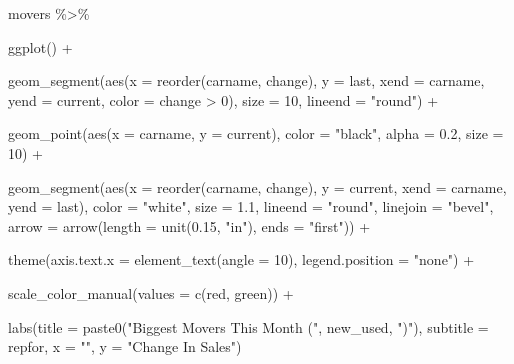 \documentclass[
]{article}
\newenvironment{Shaded}{\begin{snugshade}}{\end{snugshade}}
\newcommand{\AttributeTok}[1]{\textcolor[rgb]{0.77,0.63,0.00}{#1}}
\newcommand{\DecValTok}[1]{\textcolor[rgb]{0.00,0.00,0.81}{#1}}
\newcommand{\FloatTok}[1]{\textcolor[rgb]{0.00,0.00,0.81}{#1}}
\newcommand{\FunctionTok}[1]{\textcolor[rgb]{0.00,0.00,0.00}{#1}}
\newcommand{\NormalTok}[1]{#1}
\newcommand{\SpecialCharTok}[1]{\textcolor[rgb]{0.00,0.00,0.00}{#1}}
\newcommand{\StringTok}[1]{\textcolor[rgb]{0.31,0.60,0.02}{#1}}
\begin{document}
\begin{Shaded}
\begin{Highlighting}[]
\NormalTok{movers }\SpecialCharTok{\%\textgreater{}\%}
  
  \FunctionTok{ggplot}\NormalTok{() }\SpecialCharTok{+} 
  
  \FunctionTok{geom\_segment}\NormalTok{(}\FunctionTok{aes}\NormalTok{(}\AttributeTok{x =} \FunctionTok{reorder}\NormalTok{(carname, change), }\AttributeTok{y =}\NormalTok{ last, }\AttributeTok{xend =}\NormalTok{ carname, }\AttributeTok{yend =}\NormalTok{ current, }\AttributeTok{color =}\NormalTok{ change }\SpecialCharTok{\textgreater{}} \DecValTok{0}\NormalTok{),}
               \AttributeTok{size =} \DecValTok{10}\NormalTok{, }\AttributeTok{lineend =} \StringTok{"round"}\NormalTok{) }\SpecialCharTok{+}
  
  \FunctionTok{geom\_point}\NormalTok{(}\FunctionTok{aes}\NormalTok{(}\AttributeTok{x =}\NormalTok{ carname, }\AttributeTok{y =}\NormalTok{ current), }\AttributeTok{color =} \StringTok{"black"}\NormalTok{, }\AttributeTok{alpha =} \FloatTok{0.2}\NormalTok{, }\AttributeTok{size  =} \DecValTok{10}\NormalTok{) }\SpecialCharTok{+}

  
  \FunctionTok{geom\_segment}\NormalTok{(}\FunctionTok{aes}\NormalTok{(}\AttributeTok{x =} \FunctionTok{reorder}\NormalTok{(carname, change), }\AttributeTok{y =}\NormalTok{ current, }\AttributeTok{xend =}\NormalTok{ carname, }\AttributeTok{yend =}\NormalTok{ last),}
               \AttributeTok{color =} \StringTok{"white"}\NormalTok{,}
               \AttributeTok{size =} \FloatTok{1.1}\NormalTok{, }\AttributeTok{lineend =} \StringTok{"round"}\NormalTok{, }\AttributeTok{linejoin =} \StringTok{"bevel"}\NormalTok{,}
               \AttributeTok{arrow =} \FunctionTok{arrow}\NormalTok{(}\AttributeTok{length =} \FunctionTok{unit}\NormalTok{(}\FloatTok{0.15}\NormalTok{, }\StringTok{"in"}\NormalTok{), }\AttributeTok{ends =} \StringTok{"first"}\NormalTok{)) }\SpecialCharTok{+}
  
  \FunctionTok{theme}\NormalTok{(}\AttributeTok{axis.text.x =} \FunctionTok{element\_text}\NormalTok{(}\AttributeTok{angle =} \DecValTok{10}\NormalTok{),}
        \AttributeTok{legend.position =} \StringTok{"none"}\NormalTok{) }\SpecialCharTok{+}
  
  \FunctionTok{scale\_color\_manual}\NormalTok{(}\AttributeTok{values =} \FunctionTok{c}\NormalTok{(red, green)) }\SpecialCharTok{+}
  
  \FunctionTok{labs}\NormalTok{(}\AttributeTok{title =} \FunctionTok{paste0}\NormalTok{(}\StringTok{"Biggest Movers This Month ("}\NormalTok{, new\_used, }\StringTok{")"}\NormalTok{),}
       \AttributeTok{subtitle =}\NormalTok{ repfor,}
       \AttributeTok{x =} \StringTok{""}\NormalTok{,}
       \AttributeTok{y =} \StringTok{"Change In Sales"}\NormalTok{)}
\end{Highlighting}
\end{Shaded}
\end{document}
